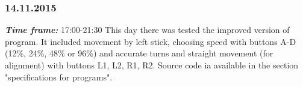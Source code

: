 \subsubsection{14.11.2015}
\textit{\textbf{Time frame:}} 17:00-21:30 \newline
This day there was tested the improved version of program. It included movement by left stick, choosing speed with buttons A-D (12\%, 24\%, 48\% or 96\%) and accurate turns and straight movement (for alignment) with buttons L1, L2, R1, R2. Source code ia available in the section "specifications for programs".


